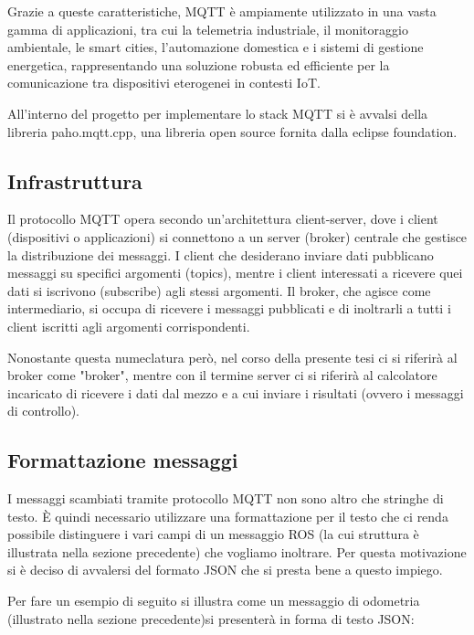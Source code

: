 \noindent Grazie a queste caratteristiche, MQTT è ampiamente utilizzato in una vasta gamma di applicazioni, tra cui la telemetria industriale, il monitoraggio ambientale, le smart cities, l'automazione domestica e i sistemi di gestione energetica, rappresentando una soluzione robusta ed efficiente per la comunicazione tra dispositivi eterogenei in contesti IoT.

\noindent All'interno del progetto per implementare lo stack MQTT si è avvalsi della libreria paho.mqtt.cpp\cite{paho_cpp}, una libreria open source fornita dalla eclipse foundation.

\subsection{Infrastruttura}
\noindent Il protocollo MQTT opera secondo un'architettura client-server, dove i client (dispositivi o applicazioni) si connettono a un server (broker) centrale che gestisce la distribuzione dei messaggi. I client che desiderano inviare dati pubblicano messaggi su specifici argomenti (topics), mentre i client interessati a ricevere quei dati si iscrivono (subscribe) agli stessi argomenti. Il broker, che agisce come intermediario, si occupa di ricevere i messaggi pubblicati e di inoltrarli a tutti i client iscritti agli argomenti corrispondenti.

\noindent Nonostante questa numeclatura però, nel corso della presente tesi ci si riferirà al broker come "broker", mentre con il termine server ci si riferirà al calcolatore incaricato di ricevere i dati dal mezzo e a cui inviare i risultati (ovvero i messaggi di controllo).

\subsection{Formattazione messaggi}
I messaggi scambiati tramite protocollo MQTT non sono altro che stringhe di testo. È quindi necessario utilizzare una formattazione per il testo che ci renda possibile distinguere i vari campi di un messaggio ROS (la cui struttura è illustrata nella sezione precedente) che vogliamo inoltrare. Per questa motivazione si è deciso di avvalersi del formato JSON che si presta bene a questo impiego.

\noindent Per fare un esempio di seguito si illustra come un messaggio di odometria (illustrato nella sezione precedente)si presenterà in forma di testo JSON:



